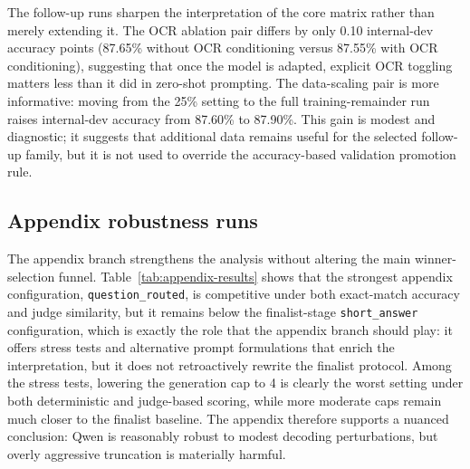 The follow-up runs sharpen the interpretation of the core matrix rather than merely extending it. The OCR ablation pair differs by only 0.10 internal-dev accuracy points (87.65\% without OCR conditioning versus 87.55\% with OCR conditioning), suggesting that once the model is adapted, explicit OCR toggling matters less than it did in zero-shot prompting. The data-scaling pair is more informative: moving from the 25\% setting to the full training-remainder run raises internal-dev accuracy from 87.60\% to 87.90\%. This gain is modest and diagnostic; it suggests that additional data remains useful for the selected follow-up family, but it is not used to override the accuracy-based validation promotion rule.

\begin{table}[t]
    \centering
    \small
    \resizebox{\textwidth}{!}{}
    \caption{Post-train internal-dev results for the full LoRA study. Core-matrix rows compare target strategy, rank, and seed. Follow-up rows inherit the winner-conditioned family and probe OCR conditioning or data scaling. Bold entries mark the best metric value in the table, with lower being better for \texttt{eval\_loss}.}
    \label{tab:trained-adapters}
\end{table}

\subsection{Appendix robustness runs}

The appendix branch strengthens the analysis without altering the main winner-selection funnel. Table~\ref{tab:appendix-results} shows that the strongest appendix configuration, \texttt{question\_routed}, is competitive under both exact-match accuracy and judge similarity, but it remains below the finalist-stage \texttt{short\_answer} configuration, which is exactly the role that the appendix branch should play: it offers stress tests and alternative prompt formulations that enrich the interpretation, but it does not retroactively rewrite the finalist protocol. Among the stress tests, lowering the generation cap to 4 is clearly the worst setting under both deterministic and judge-based scoring, while more moderate caps remain much closer to the finalist baseline. The appendix therefore supports a nuanced conclusion: Qwen is reasonably robust to modest decoding perturbations, but overly aggressive truncation is materially harmful.

\begin{table}[t]
    \centering
    \small
    \resizebox{\textwidth}{!}{}
    \caption{Validation robustness results from the appendix branch. These runs are intentionally secondary to the main funnel and are used to probe prompt-routing and decoding sensitivity without changing the core winner-selection logic. Bold entries mark the best value in each metric column.}
    \label{tab:appendix-results}
\end{table}

